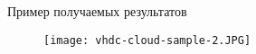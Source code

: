 \begin{frame}{Пример получаемых результатов}
\begin{figure}
    \centering
    \texttt{[image: vhdc-cloud-sample-2.JPG]}
\end{figure}
\end{frame}